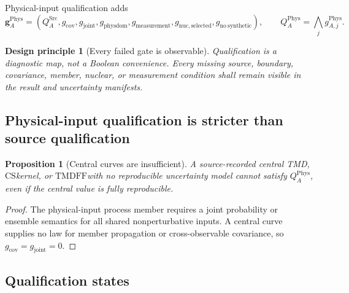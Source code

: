 \documentclass[11pt]{article}
\newtheorem{principle}[definition]{Design principle}
\newtheorem{proposition}[definition]{Proposition}
\newcommand{\CS}{\ensuremath{\mathrm{CS}}}
\newcommand{\Src}{\ensuremath{\mathrm{Src}}}
\newcommand{\Phys}{\ensuremath{\mathrm{Phys}}}
\newcommand{\TMDFF}{\ensuremath{\mathrm{TMDFF}}}
\begin{document}
Physical-input qualification adds
\begin{equation}
 \bm g_A^{\Phys}
 =
 \left(
 Q_A^{\Src},
 g_{\mathrm{cov}},
 g_{\mathrm{joint}},
 g_{\mathrm{physdom}},
 g_{\mathrm{measurement}},
 g_{\mathrm{nuc,selected}},
 g_{\mathrm{no\ synthetic}}
 \right),
 \qquad
 Q_A^{\Phys}=\bigwedge_j g_{A,j}^{\Phys}.
 \label{eq:physical-qualification}
\end{equation}

\begin{principle}[Every failed gate is observable]
Qualification is a diagnostic map, not a Boolean convenience.  Every missing source, boundary, covariance, member, nuclear, or measurement condition shall remain visible in the result and uncertainty manifests.
\end{principle}

\subsection{Physical-input qualification is stricter than source qualification}

\begin{proposition}[Central curves are insufficient]
A source-recorded central TMD, \CS kernel, or \TMDFF with no reproducible uncertainty model cannot satisfy \(Q_A^{\Phys}\), even if the central value is fully reproducible.
\end{proposition}

\begin{proof}
The physical-input process member requires a joint probability or ensemble semantics for all shared nonperturbative inputs.  A central curve supplies no law for member propagation or cross-observable covariance, so \(g_{\mathrm{cov}}=g_{\mathrm{joint}}=0\).
\end{proof}

\subsection{Qualification states}
\end{document}
